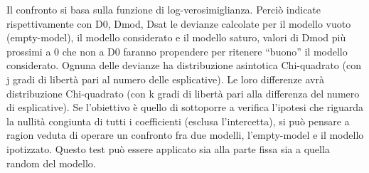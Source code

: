 \documentclass[a4page, 11pt]{article} %
\begin{document}
Il confronto si basa sulla funzione di log-verosimiglianza. Perciò indicate rispettivamente con D0, Dmod, Dsat le devianze calcolate per il modello vuoto (empty-model), il modello considerato e il modello saturo, valori di Dmod più prossimi a 0 che non a D0 faranno propendere per ritenere “buono” il modello considerato. Ognuna delle devianze ha distribuzione asintotica Chi-quadrato (con j gradi di libertà pari al numero delle esplicative). Le loro differenze avrà distribuzione Chi-quadrato (con k gradi di libertà pari alla differenza del numero di esplicative).
\newline
Se l’obiettivo è quello di sottoporre a verifica l’ipotesi che riguarda la nullità congiunta di tutti i coefficienti (esclusa l’intercetta), si può pensare a ragion veduta di operare un confronto fra due modelli, l’empty-model e il modello ipotizzato. Questo test può essere applicato sia alla parte fissa sia a quella random del modello.
\end{document}
